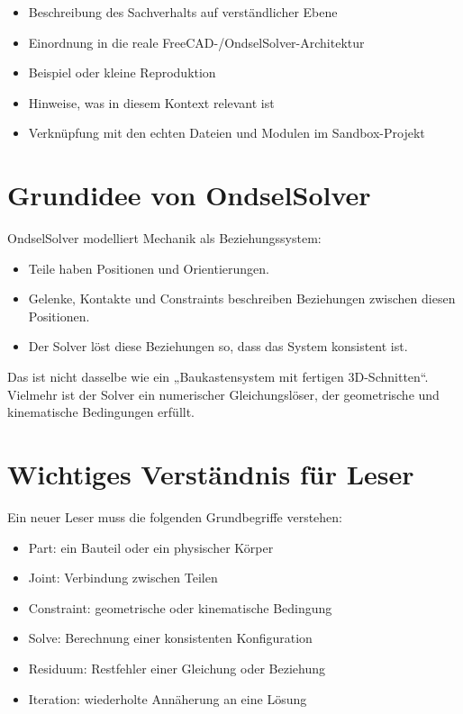 \documentclass[
  12pt
]{book}
\providecommand{\tightlist}{%
  \setlength{\itemsep}{0pt}\setlength{\parskip}{0pt}}
\begin{document}
\begin{itemize}
\tightlist
\item
  Beschreibung des Sachverhalts auf verständlicher Ebene
\item
  Einordnung in die reale FreeCAD-/OndselSolver-Architektur
\item
  Beispiel oder kleine Reproduktion
\item
  Hinweise, was in diesem Kontext relevant ist
\item
  Verknüpfung mit den echten Dateien und Modulen im Sandbox-Projekt
\end{itemize}

\hypertarget{grundidee-von-ondselsolver}{%
\section*{Grundidee von OndselSolver}\label{grundidee-von-ondselsolver}}

OndselSolver modelliert Mechanik als Beziehungssystem:

\begin{itemize}
\tightlist
\item
  Teile haben Positionen und Orientierungen.
\item
  Gelenke, Kontakte und Constraints beschreiben Beziehungen zwischen
  diesen Positionen.
\item
  Der Solver löst diese Beziehungen so, dass das System konsistent ist.
\end{itemize}

Das ist nicht dasselbe wie ein „Baukastensystem mit fertigen
3D-Schnitten``. Vielmehr ist der Solver ein numerischer Gleichungslöser,
der geometrische und kinematische Bedingungen erfüllt.

\hypertarget{wichtiges-verstuxe4ndnis-fuxfcr-leser}{%
\section*{Wichtiges Verständnis für
Leser}\label{wichtiges-verstuxe4ndnis-fuxfcr-leser}}

Ein neuer Leser muss die folgenden Grundbegriffe verstehen:

\begin{itemize}
\tightlist
\item
  Part: ein Bauteil oder ein physischer Körper
\item
  Joint: Verbindung zwischen Teilen
\item
  Constraint: geometrische oder kinematische Bedingung
\item
  Solve: Berechnung einer konsistenten Konfiguration
\item
  Residuum: Restfehler einer Gleichung oder Beziehung
\item
  Iteration: wiederholte Annäherung an eine Lösung
\end{itemize}
\end{document}
